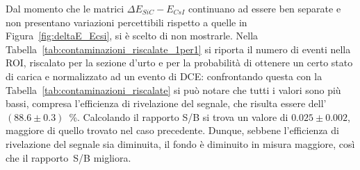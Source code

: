 

Dal momento che le matrici $\Delta E_{SiC} - E_{CsI}$ continuano ad essere ben separate e non presentano variazioni percettibili rispetto a quelle in Figura~\ref{fig:deltaE_Ecsi}, si è scelto di non mostrarle.
Nella Tabella~\ref{tab:contaminazioni_riscalate_1per1} si riporta il numero di eventi nella ROI, riscalato per la sezione d'urto e per la probabilità di ottenere un certo stato di carica e normalizzato ad un evento di DCE: confrontando questa con la Tabella~\ref{tab:contaminazioni_riscalate} si può notare che tutti i valori sono più bassi, compresa l'efficienza di rivelazione del segnale, che risulta essere dell'$(88.6 \pm 0.3)$~\%.
Calcolando il rapporto S/B si trova un valore di $0.025 \pm 0.002$, maggiore di quello trovato nel caso precedente.
Dunque, sebbene l'efficienza di rivelazione del segnale sia diminuita, il fondo è diminuito in misura maggiore, così che il rapporto~S/B migliora.



